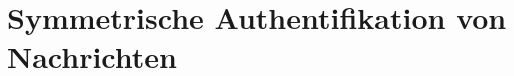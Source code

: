 \section{Symmetrische Authentifikation von Nachrichten}%
\label{symauth:sec:symmetrische_authentifikation_von_nachrichten}
